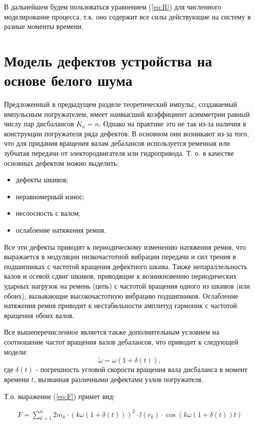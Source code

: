 В дальнейшем будем пользоваться уравнением (\ref{eq:R}) для численного моделирование процесса, т.к. оно содержит все силы
действующие на систему в разные моменты времени.

\clearpage

\section{Модель дефектов устройства на основе белого шума}

Предложенный в предыдущем разделе теоретический импульс, создаваемый импульсным погружателем,
имеет наивысший коэффициент асимметрии равный числу пар дисбалансов $K_n = n$. Однако на практике это не так
из-за наличия в конструкции погружателя ряда дефектов. В основном они возникают из-за того, что для придания
вращения валам дебалансов используется ременная или зубчатая передачи от электородвигателя или гидропривода.
Т. о. в качестве основных дефектом можно выделить:
\begin{itemize}
    \item дефекты шкивов; 
    \item неравномерный износ;
    \item несоосность с валом;
    \item ослабление натяжения ремня.
\end{itemize}
Все эти дефекты приводят к периодическому изменению натяжения ремня, что выражается в модуляции низкочастотной
вибрации передачи и сил трения в подшипниках с частотой вращения дефектного шкива. Также непараллельность валов
и осевой сдвиг шкивов, приводящие к возникновению периодических ударных нагрузок на ремень (цепь) с частотой
вращения одного из шкивов (или обоих), вызывающие высокочастотную вибрацию подшипников. Ослабление натяжения
ремня приводит к нестабильности амплитуд гармоник с частотой вращения обоих валов.

Все вышеперечисленное является также дополнительным условием на соотношение частот вращения валов дебалансов,
что приводит к следующей модели:
\begin{equation}
    \widetilde{\omega} = \omega (1 + \delta(t)),
\end{equation}
где $\delta(t)$ - погрешность угловой скорости вращения вала дисбаланса в момент времени $t$,
вызванная различными дефектами узлов погружателя.

Т.о. выражение (\ref{eq:F}) примет вид:

\begin{equation}
    \label{eq:F_noise}
    \begin{gathered}
        F = \sum\limits_{k = 1}^n 2 m_k \cdot (k \omega (1 + \delta(t)))^2 \cdot l(r_k) \cdot \cos (k \omega (1 + \delta(t)) t)
    \end{gathered}
\end{equation}

